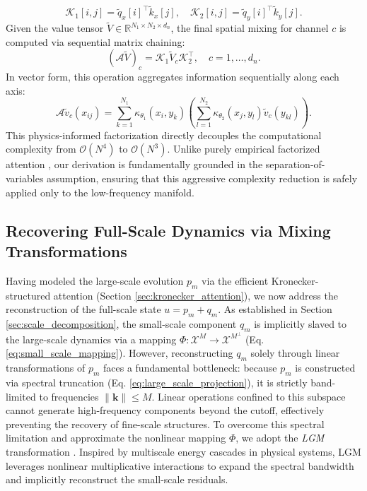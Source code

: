 \documentclass[final,3p,times]{elsarticle}
\begin{document}
\begin{equation}
\mathcal{K}_1[i, j] = \tilde{q}_x[i]^\top \tilde{k}_x[j], \quad \mathcal{K}_2[i, j] = \tilde{q}_y[i]^\top \tilde{k}_y[j].
\label{eq:kernel_matrices_rope}
\end{equation}
Given the value tensor $\tilde{V} \in \mathbb{R}^{N_1 \times N_2 \times d_{n}}$, the final spatial mixing for channel $c$ is computed via sequential matrix chaining:
\begin{equation}
(\mathcal{A}\tilde{V})_c = \mathcal{K}_1 \tilde{V}_c \mathcal{K}_2^\top, \quad c=1,\dots,d_{n}.
\label{eq:kronecker_output}
\end{equation}
In vector form, this operation aggregates information sequentially along each axis:
\begin{equation}
\mathcal{A} \tilde{v}_c \left(x_{ij}\right)=\sum_{k=1}^{N_1} \kappa_{\theta_1}\left(x_i, y_k\right)\left(\sum_{l=1}^{N_2} \kappa_{\theta_2}\left(x_j, y_l\right) \tilde{v}_c\left(y_{kl}\right)\right).
\label{eq:kronecker_vector}
\end{equation}
This physics-informed factorization directly decouples the computational complexity from $\mathcal{O}(N^4)$ to $\mathcal{O}(N^3)$. Unlike purely empirical factorized attention \cite{li2023scalable}, our derivation is fundamentally grounded in the separation-of-variables assumption, ensuring that this aggressive complexity reduction is safely applied only to the low-frequency manifold.


\subsection{Recovering Full-Scale Dynamics via Mixing Transformations}\label{sec:mixing_transformations}
Having modeled the large-scale evolution $p_m$ via the efficient Kronecker-structured attention (Section \ref{sec:kronecker_attention}), we now address the reconstruction of the full-scale state $u = p_m + q_m$. As established in Section \ref{sec:scale_decomposition}, the small-scale component $q_m$ is implicitly slaved to the large-scale dynamics via a mapping $\Phi: \mathscr{X}^M \rightarrow \mathscr{X}^{M^\perp}$ (Eq. \eqref{eq:small_scale_mapping}). 
However, reconstructing $q_m$ solely through linear transformations of $p_m$ faces a fundamental bottleneck: because $p_m$ is constructed via spectral truncation (Eq. \eqref{eq:large_scale_projection}), it is strictly band-limited to frequencies $\|\mathbf{k}\| \leq M$. Linear operations confined to this subspace cannot generate high-frequency components beyond the cutoff, effectively preventing the recovery of fine-scale structures. To overcome this spectral limitation and approximate the nonlinear mapping $\Phi$, we adopt the \textit{LGM} transformation \cite{lai2025dymixop}. Inspired by multiscale energy cascades in physical systems, LGM leverages nonlinear multiplicative interactions to expand the spectral bandwidth and implicitly reconstruct the small-scale residuals.
\end{document}
